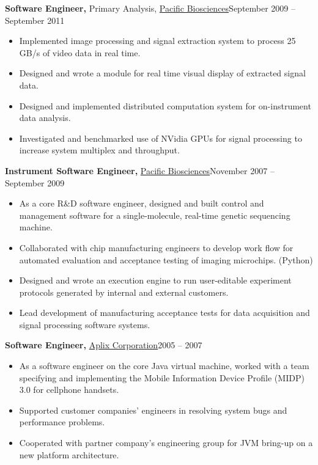 \documentclass{article}
\begin{document}
{\bf Software Engineer,} Primary Analysis, \href{http://www.pacb.com/}{Pacific Biosciences}\hfill September 2009 -- September 2011
\begin{itemize} \itemsep -2pt
    
	\item Implemented image processing and signal extraction system to process 25 GB/s of video data in real time.
    
    \item Designed and wrote a module for real time visual display of extracted signal data.
    
	\item Designed and implemented distributed computation system for on-instrument data analysis.
	
	\item Investigated and benchmarked use of NVidia GPUs for signal processing to increase system multiplex and throughput.
    
\end{itemize}

{\bf Instrument Software Engineer,} \href{http://www.pacb.com/}{Pacific Biosciences}\hfill November 2007 -- September 2009
\begin{itemize} \itemsep -2pt
    
	\item As a core R\&D software engineer, designed and built control and management software for a single-molecule, real-time genetic sequencing machine.
	
	\item Collaborated with chip manufacturing engineers to develop work flow for automated evaluation and acceptance testing of imaging microchips. (Python)
    
    \item Designed and wrote an execution engine to run user-editable experiment protocols generated by internal and external customers.
    
    \item Lead development of manufacturing acceptance tests for data acquisition and signal processing software systems.
    
\end{itemize}

{\bf Software Engineer,} \href{http://www.aplix.co.jp/en/}{Aplix Corporation}\hfill 2005 -- 2007
\begin{itemize} \itemsep -2pt
    
	\item As a software engineer on the core Java virtual machine, worked with a team specifying and implementing the Mobile Information Device Profile (MIDP) 3.0 for cellphone handsets.
	
	\item Supported customer companies' engineers in resolving system bugs and performance problems.
	
	\item Cooperated with partner company's engineering group for JVM bring-up on a new platform architecture.
    
\end{itemize}
\end{document}
